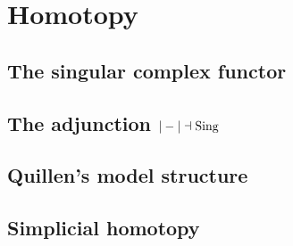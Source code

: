 \section{Homotopy}\label{sec4}

\subsection{The singular complex functor}\label{sec4.1}

\subsection{The adjunction $|-|\dashv\operatorname{Sing}$}\label{sec4.2}

\subsection{Quillen's model structure}\label{sec4.3}

\subsection{Simplicial homotopy}\label{sec4.4}

